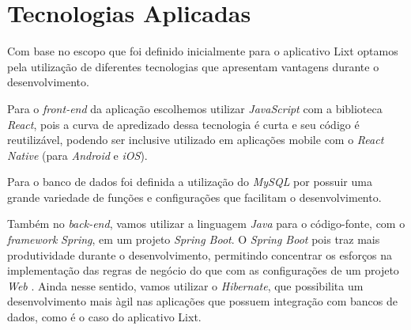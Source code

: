 \chapter{Tecnologias Aplicadas}

Com base no escopo que foi definido inicialmente para o aplicativo Lixt 
optamos pela utilização de diferentes tecnologias que apresentam vantagens 
durante o desenvolvimento.

Para o \textit{front-end} da aplicação escolhemos utilizar \textit{JavaScript} 
com a biblioteca \textit{React}, pois a curva de apredizado dessa tecnologia 
é curta e seu código é reutilizável, podendo ser inclusive utilizado em aplicações 
mobile com o \textit{React Native} (para \textit{Android} e \textit{iOS}).

Para o banco de dados foi definida a utilização do \textit{MySQL} por possuir uma 
grande variedade de funções e configurações que facilitam o desenvolvimento.

Também no \textit{back-end}, vamos utilizar a linguagem \textit{Java} para o código-fonte, com 
o \textit{framework} \textit{Spring}, em um projeto \textit{Spring Boot}. O 
\textit{Spring Boot} pois traz mais produtividade durante o desenvolvimento, permitindo concentrar os esforços na implementação das regras de negócio do que com as configurações de um projeto \textit{Web} \cite{Alga2017}. Ainda nesse sentido, vamos utilizar o \textit{Hibernate}, que possibilita um desenvolvimento mais àgil nas aplicações que possuem integração com bancos de dados, como é o caso do aplicativo Lixt.
